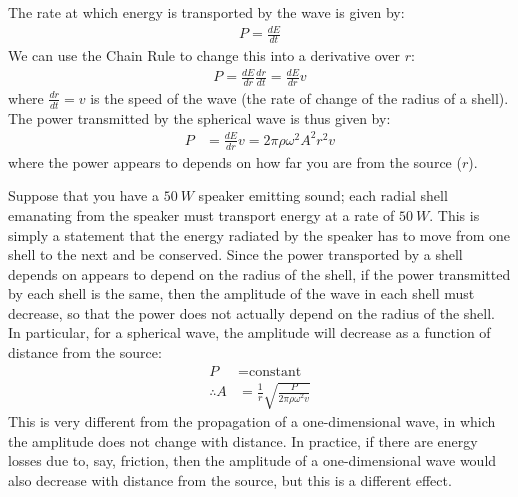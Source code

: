 The rate at which energy is transported by the wave is given by:
\begin{align*}
P = \frac{dE}{dt}
\end{align*}
We can use the Chain Rule to change this into a derivative over $r$:
\begin{align*}
P = \frac{dE}{dr}\frac{dr}{dt}=\frac{dE}{dr}v
\end{align*}
where $\frac{dr}{dt}=v$ is the speed of the wave (the rate of change of the radius of a shell). The power transmitted by the spherical wave is thus given by:
\begin{align*}
P &=\frac{dE}{dr}v =2\pi\rho  \omega^2 A^2  r^2 v
\end{align*}
where the power appears to depends on how far you are from the source ($r$). 

Suppose that you have a $\SI{50}{W}$ speaker emitting sound; each radial shell emanating from the speaker must transport energy at a rate of $\SI{50}{W}$. This is simply a statement that the energy radiated by the speaker has to move from one shell to the next and be conserved. Since the power transported by a shell depends on appears to depend on the radius of the shell, if the power transmitted by each shell is the same, then the amplitude of the wave in each shell must decrease, so that the power does not actually depend on the radius of the shell. In particular, for a spherical wave, the amplitude will decrease as a function of distance from the source:
\begin{align*}
P& = \text{constant}\\
\therefore A&=\frac{1}{r}\sqrt{\frac{P}{2\pi\rho \omega^2 v}}
\end{align*}
This is very different from the propagation of a one-dimensional wave, in which the amplitude does not change with distance. In practice, if there are energy losses due to, say, friction, then the amplitude of a one-dimensional wave would also decrease with distance from the source, but this is a different effect.


